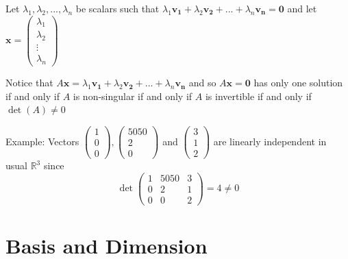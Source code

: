 \documentclass{report}
\begin{document}
\begin{myproof}
    
Let $\lambda _1, \lambda _2, ..., \lambda _n$ be scalars such that $\lambda _1\mathbf{v_1} + \lambda _2\mathbf{v_2} + ... + \lambda _n\mathbf{v_n}=\mathbf{0}$ and let $\mathbf{x} = \begin{pmatrix} \lambda _1 \\ \lambda _2 \\ \vdots \\ \lambda _n \end{pmatrix}$

Notice that $A\mathbf{x}=\lambda _1\mathbf{v_1} + \lambda _2\mathbf{v_2} + ... + \lambda _n\mathbf{v_n}$ and so $A\mathbf{x}=\mathbf{0}$ has only one solution if and only if $A$ is non-singular if and only if $A$ is invertible if and only if $\det (A)\ne 0$

Example: Vectors $\left(\begin{array}{l}1 \\ 0 \\ 0\end{array}\right),\left(\begin{array}{c}5050 \\ 2 \\ 0\end{array}\right)$ and $\left(\begin{array}{l}3 \\ 1 \\ 2\end{array}\right)$ are linearly independent in usual $\mathbb{R}^3$ since
$$
\operatorname{det}\left(\begin{array}{ccc}
1 & 5050 & 3 \\
0 & 2 & 1 \\
0 & 0 & 2
\end{array}\right)=4 \neq 0
$$
\end{myproof}


\section{Basis and Dimension}
\end{document}
